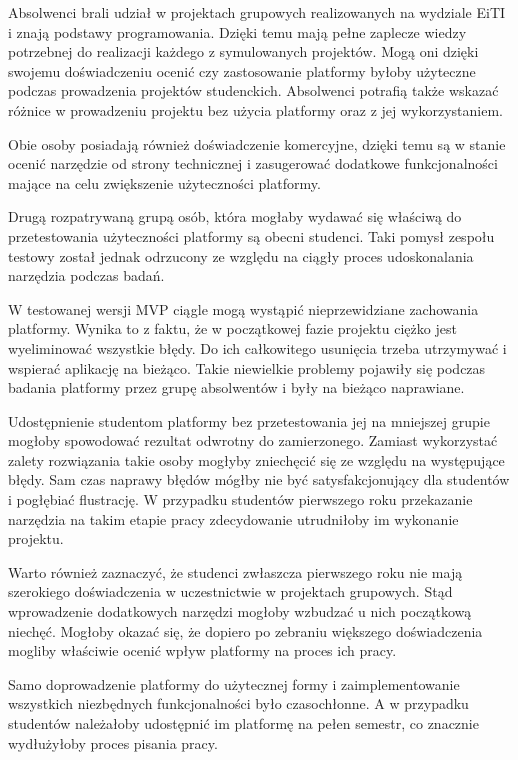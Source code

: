 Absolwenci brali udział w projektach grupowych realizowanych na wydziale EiTI i znają podstawy programowania.
Dzięki temu mają pełne zaplecze wiedzy potrzebnej do realizacji każdego z symulowanych projektów.
Mogą oni dzięki swojemu doświadczeniu ocenić czy zastosowanie platformy byłoby użyteczne podczas prowadzenia projektów studenckich.
Absolwenci potrafią także wskazać różnice w prowadzeniu projektu bez użycia platformy oraz z jej wykorzystaniem.

Obie osoby posiadają również doświadczenie komercyjne, dzięki temu są w stanie ocenić narzędzie od strony technicznej i zasugerować dodatkowe funkcjonalności mające na celu zwiększenie użyteczności platformy.

Drugą rozpatrywaną grupą osób, która mogłaby wydawać się właściwą do przetestowania użyteczności platformy są obecni studenci.
Taki pomysł zespołu testowy został jednak odrzucony ze względu na ciągły proces udoskonalania narzędzia podczas badań.

W testowanej wersji MVP ciągle mogą wystąpić nieprzewidziane zachowania platformy.
Wynika to z faktu, że w początkowej fazie projektu ciężko jest wyeliminować wszystkie błędy.
Do ich całkowitego usunięcia trzeba utrzymywać i wspierać aplikację na bieżąco.
Takie niewielkie problemy pojawiły się podczas badania platformy przez grupę absolwentów i były na bieżąco naprawiane.

Udostępnienie studentom platformy bez przetestowania jej na mniejszej grupie mogłoby spowodować rezultat odwrotny do zamierzonego.
Zamiast wykorzystać zalety rozwiązania takie osoby mogłyby zniechęcić się ze względu na występujące błędy.
Sam czas naprawy błędów mógłby nie być satysfakcjonujący dla studentów i pogłębiać flustrację.
W przypadku studentów pierwszego roku przekazanie narzędzia na takim etapie pracy zdecydowanie utrudniłoby im wykonanie projektu.

Warto również zaznaczyć, że studenci zwłaszcza pierwszego roku nie mają szerokiego doświadczenia w uczestnictwie w projektach grupowych.
Stąd wprowadzenie dodatkowych narzędzi mogłoby wzbudzać u nich początkową niechęć.
Mogłoby okazać się, że dopiero po zebraniu większego doświadczenia mogliby właściwie ocenić wpływ platformy na proces ich pracy.

Samo doprowadzenie platformy do użytecznej formy i zaimplementowanie wszystkich niezbędnych funkcjonalności było czasochłonne.
A w przypadku studentów należałoby udostępnić im platformę na pełen semestr, co znacznie wydłużyłoby proces pisania pracy.

